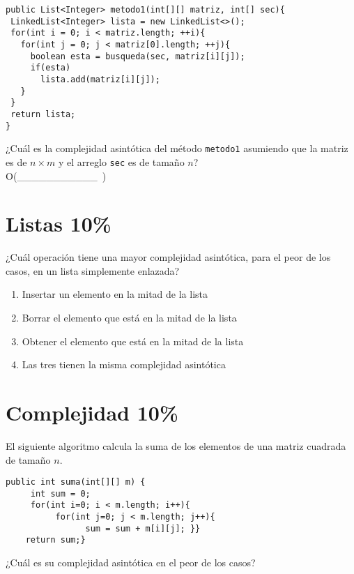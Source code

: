 \documentclass[twocolumn]{article}
\begin{document}
{\footnotesize
\begin{verbatim}
public List<Integer> metodo1(int[][] matriz, int[] sec){
 LinkedList<Integer> lista = new LinkedList<>();
 for(int i = 0; i < matriz.length; ++i){
   for(int j = 0; j < matriz[0].length; ++j){
     boolean esta = busqueda(sec, matriz[i][j]);
     if(esta)
       lista.add(matriz[i][j]);
   }
 }
 return lista;
}
\end{verbatim}
}

¿Cuál es la complejidad asintótica del método \texttt{metodo1} asumiendo que la matriz es de $n \times m$
y el arreglo \texttt{sec} es de tamaño $n$? \\

O(\_\_\_\_\_\_\_\_\_\_\_\ )


\section{Listas 10\%}
¿Cuál operación tiene una mayor complejidad asintótica, para el peor de los casos, 
en un lista simplemente enlazada?\\

{\small
\begin{enumerate}[label=\Alph*]
	\item Insertar un elemento en la mitad de la lista
	\item Borrar el elemento que está en la mitad de la lista
	\item Obtener el elemento que está en la mitad de la lista
	\item Las tres tienen la misma complejidad asintótica
\end{enumerate}
}


\section{Complejidad 10\%}

El siguiente algoritmo calcula la suma de los elementos de una matriz cuadrada de tamaño $n$. 

{\small
\begin{verbatim}
public int suma(int[][] m) { 
     int sum = 0; 
     for(int i=0; i < m.length; i++){
          for(int j=0; j < m.length; j++){
                sum = sum + m[i][j]; }}
    return sum;}
\end{verbatim}
}

¿Cuál es su complejidad asintótica en el peor de los casos?\\
\end{document}
